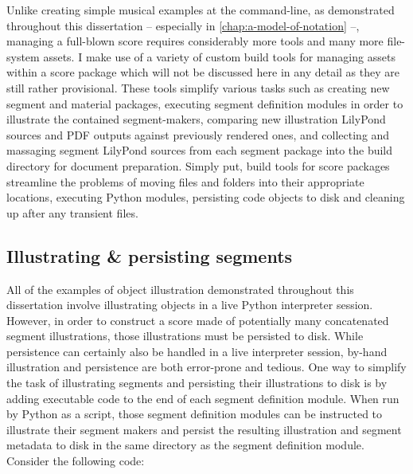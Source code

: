 Unlike creating simple musical examples at the command-line, as demonstrated
throughout this dissertation -- especially in
\autoref{chap:a-model-of-notation} --, managing a full-blown score requires
considerably more tools and many more file-system assets. I make use of a
variety of custom build tools for managing assets within a score package which
will not be discussed here in any detail as they are still rather provisional.
These tools simplify various tasks such as creating new segment and material
packages, executing segment definition modules in order to illustrate the
contained segment-makers, comparing new illustration LilyPond sources and PDF
outputs against previously rendered ones, and collecting and massaging segment
LilyPond sources from each segment package into the build directory for
document preparation. Simply put, build tools for score packages streamline the
problems of moving files and folders into their appropriate locations,
executing Python modules, persisting code objects to disk and cleaning up after
any transient files.

\subsection{Illustrating \& persisting segments}
\label{ssec:illustrating-and-persisting-segments}

All of the examples of object illustration demonstrated throughout this
dissertation involve illustrating objects in a live Python interpreter session.
However, in order to construct a score made of potentially many concatenated
segment illustrations, those illustrations must be persisted to disk. While
persistence can certainly also be handled in a live interpreter session,
by-hand illustration and persistence are both error-prone and tedious. One way
to simplify the task of illustrating segments and persisting their
illustrations to disk is by adding executable code to the end of each segment
definition module. When run by Python as a script, those segment definition
modules can be instructed to illustrate  their segment makers and persist the
resulting illustration and segment metadata to disk in the same directory as
the segment definition module. Consider the following code:

